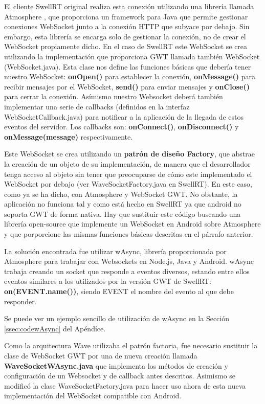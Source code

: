     El cliente SwellRT original realiza esta conexión utilizando una librería llamada Atmosphere \cite{ref:atmosphere}, que proporciona un framework para Java que permite gestionar conexiones WebSocket junto a la conexión HTTP que subyace por debajo. Sin embargo, esta librería se encarga solo de gestionar la conexión, no de crear el WebSocket propiamente dicho. En el caso de SwellRT este WebSocket se crea utilizando la implementación que proporciona GWT llamada también WebSocket (WebSocket.java). Esta clase nos define las funciones básicas que debería tener nuestro WebSocket: \textbf{onOpen()} para establecer la conexión, \textbf{onMessage()} para recibir mensajes por el WebSocket, \textbf{send()} para enviar mensajes y \textbf{onClose()} para cerrar la conexión. Asímismo nuestro Websocket deberá también implementar una serie de callbacks (definidos en la interfaz WebSocketCallback.java) para notificar a la aplicación de la llegada de estos eventos del servidor. Los callbacks son: \textbf{onConnect()}, \textbf{onDisconnect()} y \textbf{onMessage(message)} respectivamente.
	
	Este WebSocket se crea utilizando un \textbf{patrón de diseño Factory}, que abstrae la creación de un objeto de su implementación, de manera que el desarrollador tenga acceso al objeto sin tener que preocuparse de cómo este implementado el WebSocket por debajo (ver WaveSocketFactory.java en SwellRT). En este caso, como ya se ha dicho, con Atmosphere y WebSocket GWT. No obstante, la aplicación no funciona tal y como está hecho en SwellRT ya que android no soporta GWT de forma nativa. Hay que sustituir este código buscando una librería open-source que implemente un WebSocket en Android sobre Atmosphere y que porporcione las mismas funciones básicas descritas en el párrafo anterior.
	
	La solución encontrada fue utilizar wAsync\cite{ref:wAsync_github}, librería proporcionada por Atmosphere para trabajar con Websockets en Node.js, Java y Android. wAsync trabaja creando un socket que responde a eventos diversos, estando entre ellos eventos similares a los utilizados por la versión GWT de SwellRT: \textbf{on(EVENT.name())}, siendo EVENT el nombre del evento al que debe responder. 
	
	Se puede ver un ejemplo sencillo de utilización de wAsync en la Sección \ref{ssec:codewAsync} del Apéndíce.
	
	Como la arquitectura Wave utilizaba el patrón factoria, fue necesario sustituir la clase de WebSocket GWT por una de nueva creación llamada \textbf{WaveSocketWAsync.java}\cite{ref:wave_migration_github} que implementa los métodos de creación y configuración de un Websocket y de callback antes descritos. Asimismo se modificó la clase WaveSocketFactory.java para hacer uso ahora de esta nueva implementación del WebSocket compatible con Android. 
	
